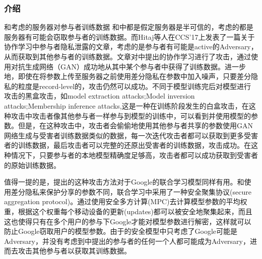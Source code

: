 \documentclass[a4paper]{article}
\begin{document}
\subsubsection{介绍}
和\cite{Phong2017PrivacyPreservingDL}考虑的服务器对参与者训练数据
\cite{shokri2015privacy}和\cite{Phong2017PrivacyPreservingDL}中都是假定服务器是半可信的，考虑的都是服务器有可能会窃取参与者的训练数据。而Hitaj等人在CCS'17上发表了一篇关于协作学习中参与者隐私泄露的文章\cite{hitaj2017deep}，考虑的是参与者有可能是active的Adversary，从而获取到其他参与者的训练数据。文章\cite{hitaj2017deep}对\cite{shokri2015privacy}中提出的协作学习进行了攻击，通过使用对抗生成网络（GAN）成功地从其中某个参与者中获得了训练数据。进一步地，即使在将参数上传至服务器之前使用差分隐私在参数中加入噪声，只要差分隐私的粒度是record-level的，攻击仍然可以成功。不同于模型训练完后对模型进行攻击的黑盒攻击，如model extraction attacks;Model inversion attacks;Membership inference attacks,这是一种在训练阶段发生的白盒攻击，在这种攻击中攻击者像其他参与者一样参与到模型的训练中，可以看到并使用模型的参数。但是，在这种攻击中，攻击者会偷偷地使用其他参与者共享的参数使用GAN网络生成与受害者训练数据类似的数据，每一次迭代攻击者都可以获取到更多受害者的训练数据，最后攻击者可以完整的还原出受害者的训练数据，攻击成功。在这种情况下，只要参与者的本地模型精确度足够高，攻击者都可以成功获取到受害者的原始训练数据。


值得一提的是，\cite{hitaj2017deep}提出的这种攻击方法对于Google的联合学习模型同样有用。和\cite{shokri2015privacy}使用差分隐私来保护分享的参数不同，联合学习中采用了一种安全聚集协议(secure aggregation protocol)\cite{bonawitz2017practical}。通过使用安全多方计算(MPC)去计算模型参数的平均权重，根据这个权重每个移动设备的更新(updates)都可以被安全地聚集起来，而且这也使得只有在多个用户的参与下Google才能对模型参数进行解密，这样就可以防止Google窃取用户的模型参数。由于\cite{bonawitz2017practical}的安全模型中只考虑了Google可能是Adversary，并没有考虑到\cite{hitaj2017deep}中提出的参与者的任何一个人都可能成为Adversary，进而去攻击其他参与者以获取其训练数据。
\end{document}
